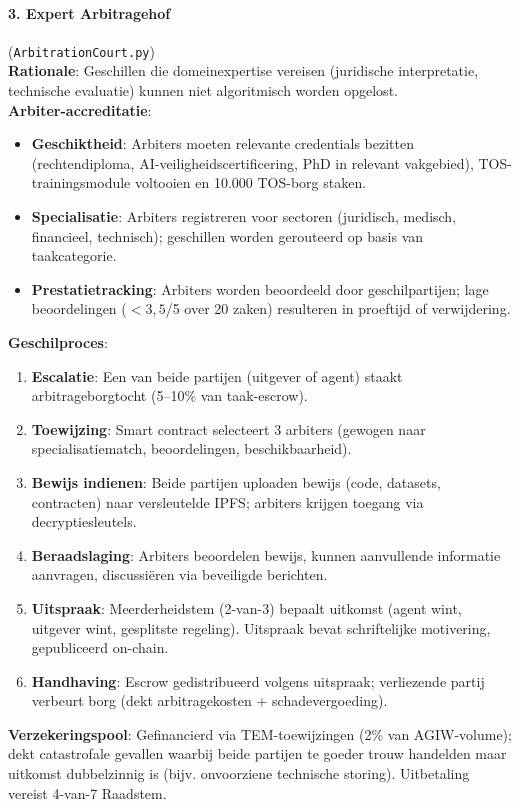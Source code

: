 \documentclass[11pt]{article}
\begin{document}
\paragraph{3. Expert Arbitragehof} (\texttt{ArbitrationCourt.py})\\
\textbf{Rationale}: Geschillen die domeinexpertise vereisen (juridische interpretatie, technische evaluatie) kunnen niet algoritmisch worden opgelost.\\
\textbf{Arbiter-accreditatie}:
\begin{itemize}[noitemsep]
  \item \textbf{Geschiktheid}: Arbiters moeten relevante credentials bezitten (rechtendiploma, AI-veiligheidscertificering, PhD in relevant vakgebied), TOS-trainingsmodule voltooien en 10.000 TOS-borg staken.
  \item \textbf{Specialisatie}: Arbiters registreren voor sectoren (juridisch, medisch, financieel, technisch); geschillen worden gerouteerd op basis van taakcategorie.
  \item \textbf{Prestatietracking}: Arbiters worden beoordeeld door geschilpartijen; lage beoordelingen ($<3,5$/5 over 20 zaken) resulteren in proeftijd of verwijdering.
\end{itemize}
\textbf{Geschilproces}:
\begin{enumerate}[noitemsep]
  \item \textbf{Escalatie}: Een van beide partijen (uitgever of agent) staakt arbitrageborgtocht (5--10\% van taak-escrow).
  \item \textbf{Toewijzing}: Smart contract selecteert 3 arbiters (gewogen naar specialisatiematch, beoordelingen, beschikbaarheid).
  \item \textbf{Bewijs indienen}: Beide partijen uploaden bewijs (code, datasets, contracten) naar versleutelde IPFS; arbiters krijgen toegang via decryptiesleutels.
  \item \textbf{Beraadslaging}: Arbiters beoordelen bewijs, kunnen aanvullende informatie aanvragen, discussiëren via beveiligde berichten.
  \item \textbf{Uitspraak}: Meerderheidstem (2-van-3) bepaalt uitkomst (agent wint, uitgever wint, gesplitste regeling). Uitspraak bevat schriftelijke motivering, gepubliceerd on-chain.
  \item \textbf{Handhaving}: Escrow gedistribueerd volgens uitspraak; verliezende partij verbeurt borg (dekt arbitragekosten + schadevergoeding).
\end{enumerate}
\textbf{Verzekeringspool}: Gefinancierd via TEM-toewijzingen (2\% van AGIW-volume); dekt catastrofale gevallen waarbij beide partijen te goeder trouw handelden maar uitkomst dubbelzinnig is (bijv. onvoorziene technische storing). Uitbetaling vereist 4-van-7 Raadstem.
\end{document}
